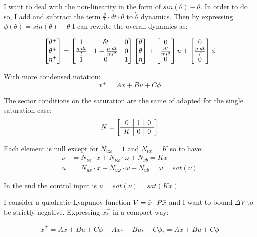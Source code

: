 \documentclass{article}
\begin{document}
I want to deal with the non-linearity in the form of $sin(\theta) - \theta$. In order to do so, I add and subtract the term $\frac{g}{l} \cdot dt \cdot \theta$ to $\dot{\theta}$ dynamics. Then by expressing $\phi(\theta) = sin(\theta) - \theta$ I can rewrite the overall dynamics as:

\begin{equation}
  \left[\begin{matrix}
    \theta^{+} \\
    \dot{\theta}^{+} \\
    \eta^{+}
  \end{matrix}\right] = \left[\begin{matrix}
    1 & \delta t & 0 \\
    \frac{g \cdot dt}{l} & 1 - \frac{\mu \cdot dt}{m l^{2}} & 0 \\
    1 & 0 & 1
  \end{matrix}\right] \left[\begin{matrix}
    \theta \\
    \dot{\theta} \\
    \eta
  \end{matrix}\right] + \left[\begin{matrix}
    0 \\
    \frac{dt}{m l^{2}} \\
    0
  \end{matrix}\right] u + \left[\begin{matrix}
    0 \\
    \frac{g \cdot dt}{l} \\
    0 
  \end{matrix}\right] \phi 
\end{equation}

With more condensed notation:
$$
  x^{+} = A x + B u + C \phi
$$

The sector conditions on the saturation are the same of \cite{css-extended} adapted for the single saturation case:
$$
N = \left[\begin{matrix}
\begin{array}{c|c|c}
  0 & 1 & 0 \\
  \hline
  K & 0 & 0
\end{array}
\end{matrix}\right]
$$

Each element is null except for $N_{u \omega} = 1$ and $N_{\nu x} = K$ so to have:
\begin{align*}
  \nu &= N_{\nu x} \cdot x + N_{\nu \omega} \cdot \omega + N_{\nu b} = K x\\
  u &= N_{ux} \cdot x + N_{u \omega} \cdot \omega + N_{u b} = \omega = sat(\nu)
\end{align*}

In the end the control input is $u = sat(\nu) = sat(K x)$

I consider a quadratic Lyapunov function $V = \tilde{x}^\top P \tilde{x}$ and I want to bound $\Delta V$ to be strictly negative.
Expressing $\tilde{x}_*^{+}$ in a compact way:

$$
  \tilde{x}^{+} = A x + B u + C \phi - A x_* - B u_* - C \phi_* = A \tilde{x} + B \tilde{u} + C \tilde{\phi}
$$
\end{document}
